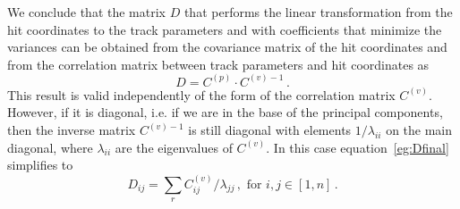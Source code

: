 \documentclass[10pt,a4paper]{article}
\begin{document}
We conclude that the matrix $D$ that performs the linear transformation from the hit coordinates to the track parameters and with coefficients that minimize the variances can be obtained from the covariance matrix of the hit coordinates and from the correlation matrix between track parameters and hit coordinates as
\begin{equation}
D = C^{(p)} \cdot C^{(v)-1} \, .
\label{eg:Dfinal}
\end{equation}
This result is valid independently of the form of the correlation matrix $C^{(v)}$. However, if it is diagonal, i.e. if we are in the base of the principal components, then the inverse matrix $C^{(v)-1}$ is still diagonal with elements $1/\lambda_{ii}$ on the main diagonal, where $\lambda_{ii}$ are the eigenvalues of $C^{(v)}$. In this case equation~\ref{eg:Dfinal} simplifies to
\begin{equation}
D_{ij} = \sum\limits_r C^{(v)}_{ij}/\lambda_{jj}\, , \, \, \mbox{for } i,j \in [1,n] \, .
\end{equation}



{}

\end{document}

